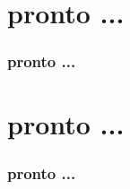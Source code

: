 \documentclass{beamer}
\begin{document}
\section{pronto ...}
\begin{frame}
\frametitle{pronto ...}

\end{frame}

\section{pronto ...}
\begin{frame}
\frametitle{pronto ...}

\end{frame}
\end{document}
